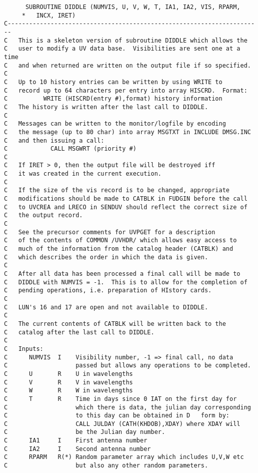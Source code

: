 \begin{verbatim}
      SUBROUTINE DIDDLE (NUMVIS, U, V, W, T, IA1, IA2, VIS, RPARM,
     *   INCX, IRET)
C-----------------------------------------------------------------------
C   This is a skeleton version of subroutine DIDDLE which allows the
C   user to modify a UV data base.  Visibilities are sent one at a time
C   and when returned are written on the output file if so specified.
C
C   Up to 10 history entries can be written by using WRITE to
C   record up to 64 characters per entry into array HISCRD.  Format:
C          WRITE (HISCRD(entry #),format) history information
C   The history is written after the last call to DIDDLE.
C
C   Messages can be written to the monitor/logfile by encoding
C   the message (up to 80 char) into array MSGTXT in INCLUDE DMSG.INC
C   and then issuing a call:
C            CALL MSGWRT (priority #)
C
C   If IRET > 0, then the output file will be destroyed iff
C   it was created in the current execution.
C
C   If the size of the vis record is to be changed, appropriate
C   modifications should be made to CATBLK in FUDGIN before the call
C   to UVCREA and LRECO in SENDUV should reflect the correct size of
C   the output record.
C
C   See the precursor comments for UVPGET for a description
C   of the contents of COMMON /UVHDR/ which allows easy access to
C   much of the information from the catalog header (CATBLK) and
C   which describes the order in which the data is given.
C
C   After all data has been processed a final call will be made to
C   DIDDLE with NUMVIS = -1.  This is to allow for the completion of
C   pending operations, i.e. preparation of HIstory cards.
C
C   LUN's 16 and 17 are open and not available to DIDDLE.
C
C   The current contents of CATBLK will be written back to the
C   catalog after the last call to DIDDLE.
C
C   Inputs:
C      NUMVIS  I    Visibility number, -1 => final call, no data
C                   passed but allows any operations to be completed.
C      U       R    U in wavelengths
C      V       R    V in wavelengths
C      W       R    W in wavelengths
C      T       R    Time in days since 0 IAT on the first day for
C                   which there is data, the julian day corresponding
C                   to this day can be obtained in D   form by:
C                   CALL JULDAY (CATH(KHDOB),XDAY) where XDAY will
C                   be the Julian day number.
C      IA1     I    First antenna number
C      IA2     I    Second antenna number
C      RPARM   R(*) Random parameter array which includes U,V,W etc
C                   but also any other random parameters.

\end{verbatim}
